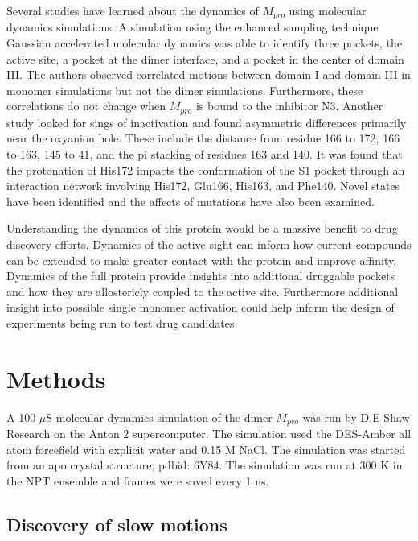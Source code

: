 \documentclass{biophys-new}
\begin{document}
Several studies have learned about the dynamics of $M_{pro}$ using molecular dynamics simulations. A simulation using the enhanced sampling technique Gaussian accelerated molecular dynamics was able to identify three pockets, the active site, a pocket at the dimer interface, and a pocket in the center of domain III. The authors observed correlated motions between domain I and domain III in monomer simulations but not the dimer simulations. Furthermore, these correlations do not change when $M_{pro}$ is bound to the inhibitor N3\cite{sztain2020elucidation}. Another study looked for sings of inactivation and found asymmetric differences primarily near the oxyanion hole. These include the distance from residue 166 to 172, 166 to 163, 145 to 41, and the pi stacking of residues 163 and 140.\cite{inizan2021high} It was found that the protonation of His172  impacts the conformation of the S1 pocket through an interaction network involving His172, Glu166, His163, and Phe140.\cite{verma2020proton} Novel states have been identified \cite{carli2020candidate, cocina2020sapphire} and the affects of mutations have also been examined. \cite{dubanevics2021computational, zhou2019identification}

Understanding the dynamics of this protein would be a massive benefit to drug discovery efforts. Dynamics of the active sight can inform how current compounds can be extended to make greater contact with the protein and improve affinity. Dynamics of the full protein provide insights into additional druggable pockets and how they are allostericly coupled to the active site. Furthermore additional insight into possible single monomer activation could help inform the design of experiments being run to test drug candidates.

\section*{Methods}

A 100 $\mu$S molecular dynamics simulation of the dimer $M_{pro}$ was run by D.E Shaw Research on the Anton 2 supercomputer.\cite{shaw2020molecular} The simulation used the DES-Amber all atom forcefield\cite{piana2020development} with explicit water and 0.15 M NaCl. The simulation was started from an apo crystal structure, pdbid: 6Y84. The simulation was run at 300 K in the NPT ensemble and frames were saved every 1 ns.

\subsection*{Discovery of slow motions}
\end{document}
